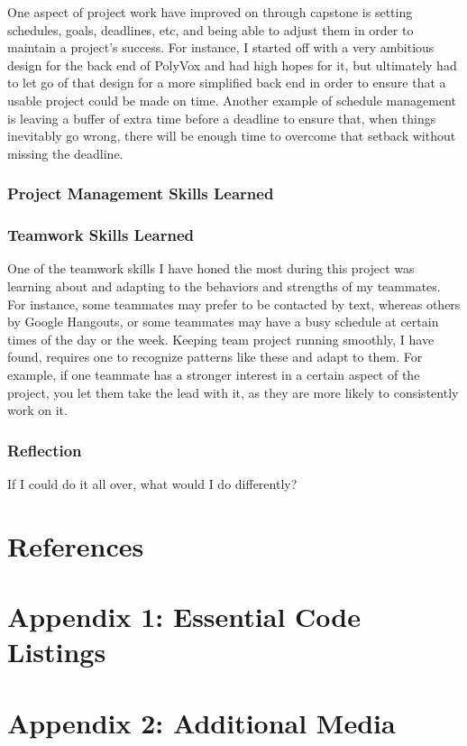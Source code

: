 \documentclass[onecolumn, draftclsnofoot,10pt, compsoc]{IEEEtran}
\begin{document}
One aspect of project work have improved on through capstone is setting schedules, goals, deadlines, etc, and being able to adjust them in order to maintain a project’s success. For instance, I started off with a very ambitious design for the back end of PolyVox and had high hopes for it, but ultimately had to let go of that design for a more simplified back end in order to ensure that a usable project could be made on time. Another example of schedule management is leaving a buffer of extra time before a deadline to ensure that, when things inevitably go wrong, there will be enough time to overcome that setback without missing the deadline.


\subsubsection{Project Management Skills Learned}




\subsubsection{Teamwork Skills Learned}

One of the teamwork skills I have honed the most during this project was learning about and adapting to the behaviors and strengths of my teammates. For instance, some teammates may prefer to be contacted by text, whereas others by Google Hangouts, or some teammates may have a busy schedule at certain times of the day or the week. Keeping team project running smoothly, I have found, requires one to recognize patterns like these and adapt to them. For example, if one teammate has a stronger interest in a certain aspect of the project, you let them take the lead with it, as they are more likely to consistently work on it.


\subsubsection{Reflection}

If I could do it all over, what would I do differently?


\section{References}


\appendix

\section{Appendix 1: Essential Code Listings}

\section{Appendix 2: Additional Media}
\end{document}
